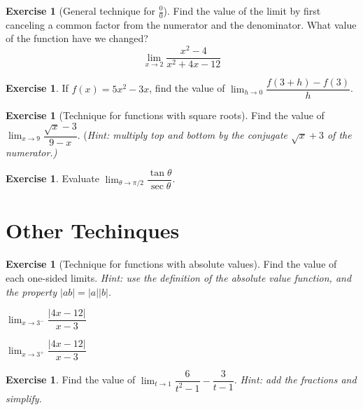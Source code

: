 \documentclass[11pt,reqno,final]{amsart}
\numberwithin{figure}{section}
\theoremstyle{definition} %
\newtheorem{exercise}[question]{Exercise}
\newcommand{\dlim}{\displaystyle\lim}
\begin{document}
\begin{exercise}[General technique for $\frac{0}{0}$]
        Find the value of the limit by first canceling a common factor from the numerator and the denominator.
        What value of the function have we changed?
        \[
                \dlim_{x \to 2}\dfrac{x^2-4}{x^2+4x-12}
        \]
        \vfill
\end{exercise}

\begin{exercise}
        If $f(x) = 5x^2-3x$, find the value of $\dlim_{h \to 0}\dfrac{f(3+h)-f(3)}{h}$.
        \vfill          
\end{exercise}

\begin{exercise}[Technique for functions with square roots]
        Find the value of $\dlim_{x \to 9}\dfrac{\sqrt x - 3}{9-x}$.
        (\textit{Hint: multiply top and bottom by the conjugate $\sqrt x +3$ of the numerator.)}
        \vfill
\end{exercise}

\newpage

\begin{exercise}
        Evaluate $\dlim_{\theta \to \pi/2} \dfrac{\tan \theta}{\sec \theta}$.
        \vfill
\end{exercise}

\section{Other Techinques}
\begin{exercise}[Technique for functions with absolute values]
        Find the value of each one-sided limits.
        \textit{Hint: use the definition of the absolute value function, and the property $|ab| = |a||b|$.}\\
        \begin{enumerate*}[(i)]
        \item $\dlim_{x \to 3^-} \dfrac{|4x-12|}{x-3}$
                \qquad \qquad \qquad $ $ \qquad \qquad \qquad
        \item $\dlim_{x \to 3^+} \dfrac{|4x-12|}{x-3}$
        \end{enumerate*}
        \vfill
\end{exercise}

\begin{exercise}
        Find the value of $\dlim_{t \to 1}\dfrac{6}{t^2 - 1} - \dfrac{3}{t-1}$.
        \textit{Hint: add the fractions and simplify.}
        \vfill
\end{exercise}
\end{document}

